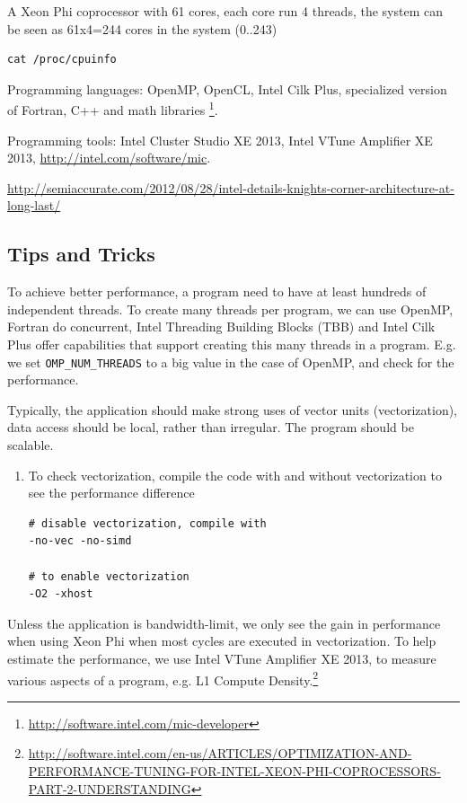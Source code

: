 A Xeon Phi coprocessor with 61 cores, each core run 4 threads, the system can be
seen as 61x4=244 cores in the system (0..243)
\begin{verbatim}
cat /proc/cpuinfo
\end{verbatim}


 Programming languages: OpenMP, OpenCL, Intel Cilk Plus, specialized version of
 Fortran, C++ and math libraries
 \footnote{\url{http://software.intel.com/mic-developer}}. 

 Programming tools: Intel Cluster Studio XE 2013,  Intel VTune Amplifier XE 
2013, 
 \url{http://intel.com/software/mic}.
 

\url{http://semiaccurate.com/2012/08/28/intel-details-knights-corner-architecture-at-long-last/} 
 
\subsection{Tips and Tricks}

To achieve better performance, a program need to have at least hundreds of
independent threads. To create many threads per program, we can use
OpenMP, Fortran do concurrent, Intel Threading Building Blocks (TBB) 
and Intel Cilk Plus offer capabilities that support creating this many threads
in a program. E.g. we set \verb!OMP_NUM_THREADS! to a big value in the case of
OpenMP, and check for the performance.

Typically, the application should make strong uses of vector units
(vectorization), data access should be local, rather than irregular. The program
should be scalable.
\begin{enumerate}
  \item To check vectorization, compile the code with and without vectorization to see
the performance difference
\begin{verbatim}
# disable vectorization, compile with
-no-vec -no-simd

# to enable vectorization
-O2 -xhost
\end{verbatim}


\end{enumerate}

Unless the application is bandwidth-limit, we only see the gain in performance
when using Xeon Phi when most cycles are executed in vectorization. To help
estimate the performance, we use Intel VTune Amplifier XE 2013, to measure
various aspects of a program, e.g. L1 Compute
Density.\footnote{\url{http://software.intel.com/en-us/ARTICLES/OPTIMIZATION-AND-PERFORMANCE-TUNING-FOR-INTEL-XEON-PHI-COPROCESSORS-PART-2-UNDERSTANDING}}

